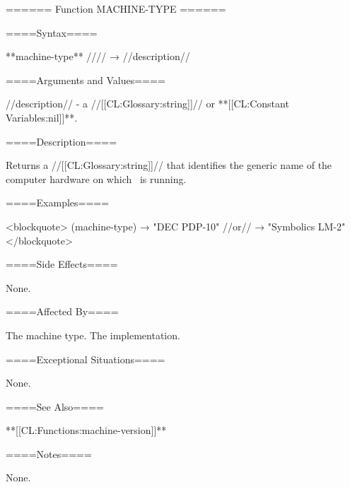 ====== Function MACHINE-TYPE ======

====Syntax====

**machine-type** //\noargs// → //description//

====Arguments and Values====

//description// - a //[[CL:Glossary:string]]// or **[[CL:Constant Variables:nil]]**.

====Description====

Returns a //[[CL:Glossary:string]]// that identifies the generic name of the computer hardware on which \clisp\ is running.

====Examples====

<blockquote> (machine-type) → "DEC PDP-10" //or// → "Symbolics LM-2" </blockquote>

====Side Effects====

None.

====Affected By====

The machine type. The implementation.

====Exceptional Situations====

None.

====See Also====

**[[CL:Functions:machine-version]]**

====Notes====

None.

